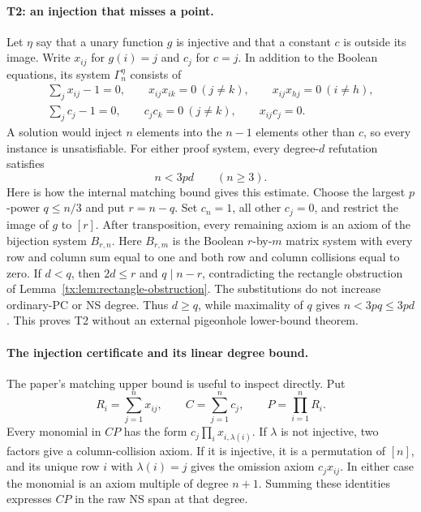 \paragraph{T2: an injection that misses a point.}
Let $\eta$ say that a unary function $g$ is injective and that a constant
$c$ is outside its image. Write $x_{ij}$ for $g(i)=j$ and $c_j$ for $c=j$.
In addition to the Boolean equations, its system $\Gamma_n^\eta$ consists of
\begin{equation}\label{tx:eq:G-witness}
\begin{gathered}
 \sum_jx_{ij}-1=0,\qquad
 x_{ij}x_{ik}=0\ (j\ne k),\qquad
 x_{ij}x_{hj}=0\ (i\ne h),\\
 \sum_jc_j-1=0,\qquad
 c_jc_k=0\ (j\ne k),\qquad x_{ij}c_j=0.
\end{gathered}
\end{equation}
A solution would inject $n$ elements into the $n-1$ elements other than $c$,
so every instance is unsatisfiable. For either proof system, every
degree-$d$ refutation satisfies
\[
 n<3pd\qquad(n\geq3).
\]
Here is how the internal matching bound gives this estimate. Choose the
largest $p$-power $q\leq n/3$ and put $r=n-q$. Set $c_n=1$, all other
$c_j=0$, and restrict the image of $g$ to $[r]$. After transposition, every
remaining axiom is an axiom of the bijection system $B_{r,n}$.
Here $B_{r,m}$ is the Boolean $r$-by-$m$ matrix system with every row and
column sum equal to one and both row and column collisions equal to zero.
If $d<q$, then $2d\leq r$ and $q\mid n-r$, contradicting the rectangle
obstruction of Lemma~\ref{tx:lem:rectangle-obstruction}. The substitutions do
not increase ordinary-PC or NS degree. Thus $d\geq q$, while maximality of
$q$ gives $n<3pq\leq3pd$. This proves T2 without an external pigeonhole
lower-bound theorem.

\paragraph{The injection certificate and its linear degree bound.}
The paper's matching upper bound is useful to inspect directly. Put
\[
 R_i=\sum_{j=1}^n x_{ij},\qquad C=\sum_{j=1}^n c_j,
                    \qquad P=\prod_{i=1}^n R_i.
\]
Every monomial in $CP$ has the form $c_j\prod_i x_{i,\lambda(i)}$.
If $\lambda$ is not injective, two factors give a column-collision
axiom. If it is injective, it is a permutation of $[n]$, and its
unique row $i$ with $\lambda(i)=j$ gives the omission axiom
$c_jx_{ij}$. In either case the monomial is an axiom multiple of
degree $n+1$. Summing these identities expresses $CP$ in the raw NS
span at that degree.

